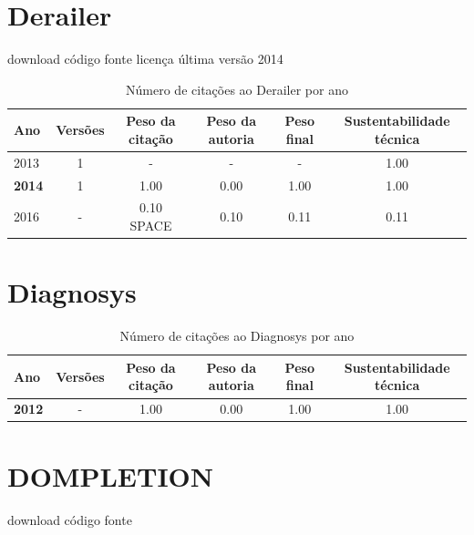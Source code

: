 \section{Derailer}
\checkmark download
\checkmark código fonte
\checkmark licença
\checkmark última versão 2014


\begin{table}[H]
\caption{Número de citações ao Derailer por ano}
\centering
\begin{tabular}{| l | c | c | c | c | c |}
  \hline
  Ano & Versões & Peso da citação & Peso da autoria & Peso final & Sustentabilidade técnica \\
  \hline
        2013 & 1 & - & - & -
        &
          {\color{blue} 1.00}
        \\
\hline
            {\bf 2014}
          &
          1
          &
          1.00
          &
          0.00
          &
          1.00
          &
            {\color{blue} 1.00}
          \\
\hline
            2016
          &
          -
          &
          0.10
            {\tiny SPACE}
          &
          0.10
          &
          0.11
          &
            {\color{red} 0.11}
          \\
\hline
\end{tabular}
\end{table}



\section{Diagnosys}


\begin{table}[H]
\caption{Número de citações ao Diagnosys por ano}
\centering
\begin{tabular}{| l | c | c | c | c | c |}
  \hline
  Ano & Versões & Peso da citação & Peso da autoria & Peso final & Sustentabilidade técnica \\
  \hline
            {\bf 2012}
          &
          -
          &
          1.00
          &
          0.00
          &
          1.00
          &
            {\color{blue} 1.00}
          \\
\hline
\end{tabular}
\end{table}



\section{DOMPLETION}
\checkmark download
\checkmark código fonte


